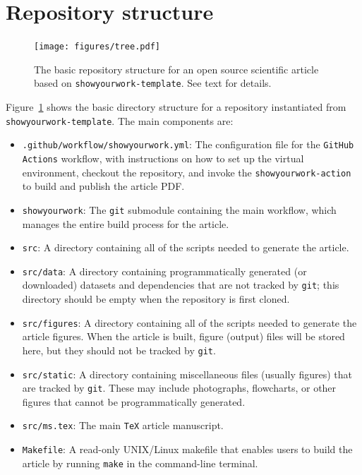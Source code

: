 \documentclass[twocolumn]{aastex631}
\begin{document}
\section{Repository structure}
\label{sec:struct}
%
\begin{figure}[ht!]
    \begin{centering}
        \texttt{[image: figures/tree.pdf]}
        \caption{
            The basic repository structure for an open source scientific article based on \texttt{showyourwork-template}.
            See text for details.
        }
        \label{fig:tree}
    \end{centering}
\end{figure}
%
Figure~\ref{fig:tree} shows the basic directory structure for a repository instantiated from \texttt{showyourwork-template}. 
The main components are:
\begin{itemize}
    \item \texttt{.github/workflow/showyourwork.yml}: The configuration file for the \texttt{GitHub Actions} workflow, with instructions on how to set up the virtual environment, checkout the repository, and invoke the \texttt{showyourwork-action} to build and publish the article PDF.
    \item \texttt{showyourwork}: The \texttt{git} submodule containing the main workflow, which manages the entire build process for the article.
    \item \texttt{src}: A directory containing all of the scripts needed to generate the article.
    \item \texttt{src/data}: A directory containing programmatically generated (or downloaded) datasets and dependencies that are not tracked by \texttt{git}; this directory should be empty when the repository is first cloned.
    \item \texttt{src/figures}: A directory containing all of the scripts needed to generate the article figures.
    When the article is built, figure (output) files will be stored here, but they should not be tracked by \texttt{git}.
    \item \texttt{src/static}: A directory containing miscellaneous files (usually figures) that are tracked by \texttt{git}.
    These may include photographs, flowcharts, or other figures that cannot be programmatically generated.
    \item \texttt{src/ms.tex}: The main \texttt{TeX} article manuscript.
    \item \texttt{Makefile}: A read-only UNIX/Linux makefile that enables users to build the article by running \texttt{make} in the command-line terminal.

\end{itemize}
\end{document}
